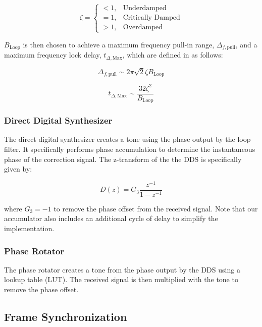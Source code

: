 \documentclass[conference,onecolumn]{IEEEtran}
\begin{document}
\begin{equation}
\zeta = \begin{cases}
< 1, & \text{Underdamped}\\
= 1, & \text{Critically Damped}\\
> 1, & \text{Overdamped}
\end{cases}
\end{equation}

\noindent $B_\text{Loop}$ is then chosen to achieve a maximum frequency pull-in range, $\Delta_{f,\text{pull}}$, and a maximum frequency lock delay, $t_{\Delta,\text{Max}}$, which are defined in \cite{collins_2018_softwaredefined} as follows:

\begin{equation}
	\label{eq::max_freq_correct}
	\Delta_{f,\text{pull}} \sim 2\pi\sqrt{2}\zeta{B_\text{Loop}}\end{equation}

\begin{equation}
	t_{\Delta,\text{Max}} \sim \frac{32\zeta^2}{B_\text{Loop}}\end{equation}

\subsubsection{Direct Digital Synthesizer}

The direct digital synthesizer creates a tone using the phase output by the loop filter. It specifically performs phase accumulation to determine the instantaneous phase of the correction signal. The z-transform of the the DDS is specifically given by:

\begin{equation}
	D(z) = G_3\frac{z^{-1}}{1 - z^{-1}}
\end{equation}

\noindent where $G_3 = -1$ to remove the phase offset from the received signal. Note that our accumulator also includes an additional cycle of delay to simplify the implementation.

\subsubsection{Phase Rotator}

The phase rotator creates a tone from the phase output by the DDS using a lookup table (LUT). The received signal is then multiplied with the tone to remove the phase offset.

\subsection{Frame Synchronization}
\end{document}
